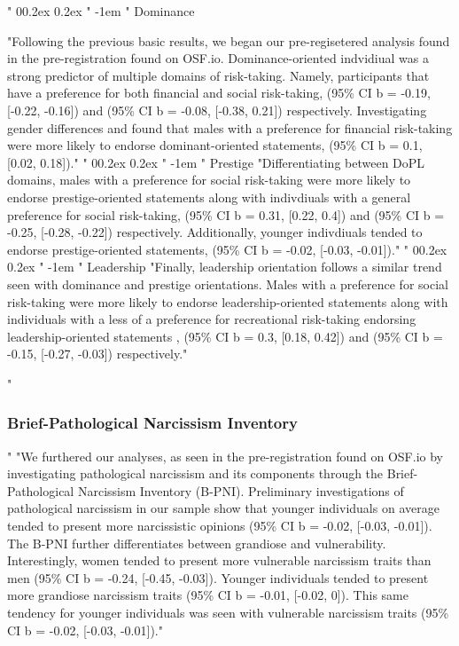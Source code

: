 \documentclass[
"  donotrepeattitle,doc, 12pt, a4paper,floatsintext]{apa7}"
\makeatletter
\renewcommand{\paragraph}{\@startsection{paragraph}{4}{\parindent}%
"  {0\baselineskip \@plus 0.2ex \@minus 0.2ex}%
"  {-1em}%
"  {\normalfont\normalsize\bfseries\itshape\typesectitle}}"
\makeatother
\begin{document}
\hypertarget{dominance-1}{%
\paragraph{Dominance}\label{dominance-1}}
"Following the previous basic results, we began our pre-regisetered analysis found in the pre-registration found on OSF.io. Dominance-oriented indvidiual was a strong predictor of multiple domains of risk-taking. Namely, participants that have a preference for both financial and social risk-taking, (95\% CI b = -0.19, {[}-0.22, -0.16{]}) and (95\% CI b = -0.08, {[}-0.38, 0.21{]}) respectively. Investigating gender differences and found that males with a preference for financial risk-taking were more likely to endorse dominant-oriented statements, (95\% CI b = 0.1, {[}0.02, 0.18{]})."
\hypertarget{prestige-1}{%
\paragraph{Prestige}\label{prestige-1}}
"Differentiating between DoPL domains, males with a preference for social risk-taking were more likely to endorse prestige-oriented statements along with indivdiuals with a general preference for social risk-taking, (95\% CI b = 0.31, {[}0.22, 0.4{]}) and (95\% CI b = -0.25, {[}-0.28, -0.22{]}) respectively. Additionally, younger indivdiuals tended to endorse prestige-oriented statements, (95\% CI b = -0.02, {[}-0.03, -0.01{]})."
\hypertarget{leadership-1}{%
\paragraph{Leadership}\label{leadership-1}}
"Finally, leadership orientation follows a similar trend seen with dominance and prestige orientations. Males with a preference for social risk-taking were more likely to endorse leadership-oriented statements along with individuals with a less of a preference for recreational risk-taking endorsing leadership-oriented statements , (95\% CI b = 0.3, {[}0.18, 0.42{]}) and (95\% CI b = -0.15, {[}-0.27, -0.03{]}) respectively."
\hypertarget{brief-pathological-narcissism-inventory-1}{%
"\subsubsection{Brief-Pathological Narcissism Inventory}\label{brief-pathological-narcissism-inventory-1}}"
"We furthered our analyses, as seen in the pre-registration found on OSF.io by investigating pathological narcissism and its components through the Brief-Pathological Narcissism Inventory (B-PNI). Preliminary investigations of pathological narcissism in our sample show that younger individuals on average tended to present more narcissistic opinions (95\% CI b = -0.02, {[}-0.03, -0.01{]}). The B-PNI further differentiates between grandiose and vulnerability. Interestingly, women tended to present more vulnerable narcissism traits than men (95\% CI b = -0.24, {[}-0.45, -0.03{]}). Younger individuals tended to present more grandiose narcissism traits (95\% CI b = -0.01, {[}-0.02, 0{]}). This same tendency for younger individuals was seen with vulnerable narcissism traits (95\% CI b = -0.02, {[}-0.03, -0.01{]})."
\end{document}
